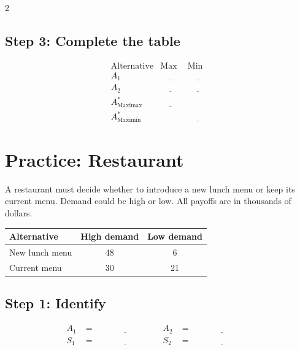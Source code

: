 \begin{multicols}{2}
		\subsection*{Step 3: Complete the table}
		
		\[
		\begin{array}{c|c|c}
			\text{Alternative} & \text{Max} & \text{Min}\\
			\hline
			A_1 & \underline{\hspace{1cm}} & \underline{\hspace{1cm}}\\
			A_2 & \underline{\hspace{1cm}} & \underline{\hspace{1cm}}\\
			\hline
			A^*_{\mathrm{Maximax}} & \underline{\hspace{1cm}} & \\
			A^*_{\mathrm{Maximin}} & & \underline{\hspace{1cm}}
		\end{array}
		\]
		
		
		\section{Practice: Restaurant}
		A restaurant must decide whether to introduce a new lunch menu or keep
		its current menu. Demand could be high or low. All payoffs are in thousands of dollars.
		\begin{center}
			\renewcommand{\arraystretch}{1.3}
			\small
			\begin{tabular}{lcc}
				\toprule
				Alternative & High demand & Low demand \\
				\midrule
				New lunch menu & 48 & 6 \\
				Current menu & 30 & 21 \\
				\bottomrule
			\end{tabular}
		\end{center}
		\vspace{-5mm}
		
		\subsection*{Step 1: Identify}
		\[
		\begin{array}{llll}
			A_1 &= \underline{\hspace{3cm}} &
			A_2 &= \underline{\hspace{3cm}} \\[3pt]
			S_1 &= \underline{\hspace{3cm}} &
			S_2 &= \underline{\hspace{3cm}}
		\end{array}
		\]

\end{multicols}

